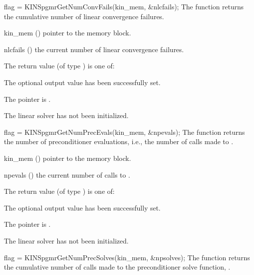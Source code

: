 {}
{
  flag = KINSpgmrGetNumConvFails(kin\_mem, \&nlcfails);
}
{
  The function  returns the
  cumulative number of linear convergence failures.
}
{
  \begin{args}
  \item[kin\_mem] ()
    pointer to the {\kinsol} memory block.
  \item[nlcfails] ()
    the current number of linear convergence failures.
  \end{args}
}
{
  The return value  (of type ) is one of:
  \begin{args}
  \item[\Id{KINSPGMR\_SUCCESS}] 
    The optional output value has been successfully set.
  \item[\Id{KINSPGMR\_MEM\_NULL}]
    The  pointer is .
  \item[\Id{KINSPGMR\_LMEM\_NULL}]
    The {\kinspgmr} linear solver has not been initialized.
  \end{args}
}
{}
{
  flag = KINSpgmrGetNumPrecEvals(kin\_mem, \&npevals);
}
{
  The function  returns the
  number of preconditioner evaluations, i.e., the number of 
  calls made to .
}
{
  \begin{args}
  \item[kin\_mem] ()
    pointer to the {\kinsol} memory block.
  \item[npevals] ()
    the current number of calls to .
  \end{args}
}
{
  The return value  (of type ) is one of:
  \begin{args}
  \item[\Id{KINSPGMR\_SUCCESS}] 
    The optional output value has been successfully set.
  \item[\Id{KINSPGMR\_MEM\_NULL}]
    The  pointer is .
  \item[\Id{KINSPGMR\_LMEM\_NULL}]
    The {\kinspgmr} linear solver has not been initialized.
  \end{args}
}
{}
{
  flag = KINSpgmrGetNumPrecSolves(kin\_mem, \&npsolves);
}
{
  The function  returns the
  cumulative number of calls made to the preconditioner 
  solve function, .
}
